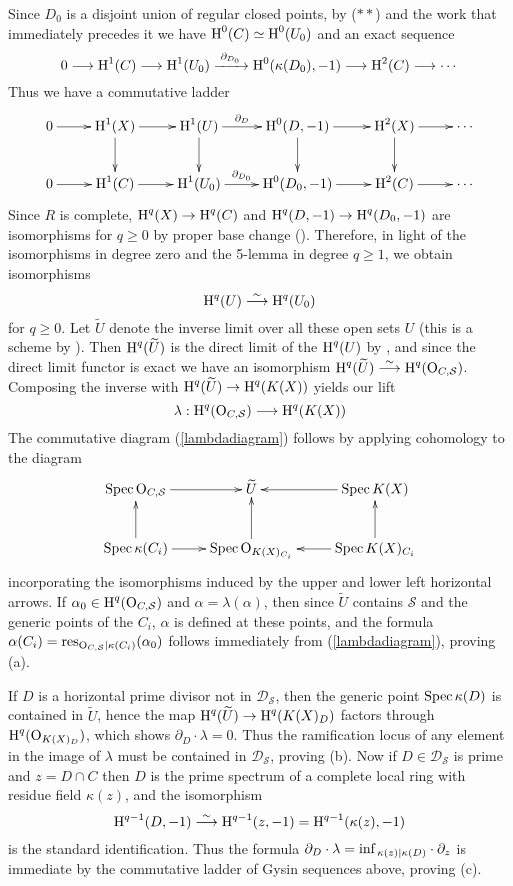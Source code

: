 \documentclass{amsart}
\theoremstyle{plain}
\theoremstyle{definition}
\theoremstyle{remark}
\numberwithin{equation}{section}%
\renewcommand{\H}{{\text{\rm H}}}
\renewcommand{\O}{{\text{\rm O}}}
\renewcommand{\S}{{\mathcal S}}
\renewcommand{\inf}{{\text{\rm inf}\,}}
\newcommand{\isim}{{\;\overset{\sim}{\longrightarrow}\;}}
\newcommand{\isom}{{\;\simeq\;}}
\newcommand{\res}{{\text{\rm res}}}
\newcommand{\Spec}{{\text{\rm Spec}\,}}
\begin{document}
Since $D_0$ is a disjoint union of regular closed points,
by ($**$) and the work that immediately precedes it we have
$\H^0(C)\isom\H^0(U_0)$ and an exact sequence
$$
0\longrightarrow\H^1(C)\longrightarrow\H^1(U_0)\xrightarrow{\;\partial_{D_0}\;}\H^0(\kappa(D_0),-1)
\longrightarrow \H^2(C)\longrightarrow\cdots
$$
Thus we have a commutative ladder
\[\xymatrix{
0\ar[r]&\H^1(X)\ar[r]\ar[d]&\H^1(U)\ar[r]^-{\partial_D}\ar[d]
&\H^0(D,-1)\ar[r]\ar[d]&\H^2(X)\ar[r]\ar[d]&\cdots\\
0\ar[r]&\H^1(C)\ar[r]&\H^1(U_0)\ar[r]^-{\partial_{D_0}}&\H^0(D_0,-1)
\ar[r]&\H^2(C)\ar[r]&\cdots
}\]
Since $R$ is complete,
$\H^q(X)\to\H^q(C)$ and $\H^q(D,-1)\to\H^q(D_0,-1)$ are
isomorphisms for $q\geq 0$ by proper base change (\cite[VI.Corollary 2.7]{M}).
Therefore, in light of the isomorphisms in degree zero and the 5-lemma in degree $q\geq 1$, 
we obtain isomorphisms
$$\H^q(U)\isim\H^q(U_0)$$
for $q\geq 0$.
Let $\widetilde U$ denote the inverse limit over all these open sets $U$ (this is a scheme by \cite[8.2.3]{EGAIV:c}).
Then $\H^q(\widetilde U)$ is the direct limit of the $\H^q(U)$ by \cite[III.1.16]{M}, and since
the direct limit functor is exact we have an isomorphism
$\H^q(\widetilde U)\isim\H^q(\O_{C,\S})$.
Composing the inverse with $\H^q(\widetilde U)\to\H^q(K(X))$ yields our lift
$$\lambda:\H^q(\O_{C,\S})\longrightarrow\H^q(K(X))$$
The commutative diagram (\ref{lambdadiagram}) follows by applying cohomology to the diagram
\[\xymatrix{
\Spec\O_{C,\S}\ar[r]&\widetilde U&\Spec K(X)\ar[l]\\
\Spec \kappa(C_i)\ar[r]\ar[u]&\Spec\O_{K(X)_{C_i}}\ar[u]&\Spec K(X)_{C_i}\ar[u]\ar[l]
}\]
incorporating the isomorphisms induced by the upper and lower left horizontal arrows.
If $\alpha_0\in\H^q(\O_{C,\S})$ and $\alpha=\lambda(\alpha)$,
then since $\widetilde U$ contains $\S$ and the generic points
of the $C_i$, $\alpha$ is defined at these points,
and the formula $\alpha(C_i)=\res_{\O_{C,\S}|\kappa(C_i)}(\alpha_0)$
follows immediately from (\ref{lambdadiagram}), proving (a).
 
If $D$ is a horizontal prime divisor not in $\mathscr D_\S$, then the generic point
$\Spec\kappa(D)$ is contained in $\widetilde U$, hence the map $\H^q(\widetilde U)\to\H^q(K(X)_D)$
factors through $\H^q(\O_{K(X)_D})$, which shows $\partial_D\cdot\lambda=0$.
Thus the ramification locus of any element in the image of $\lambda$ must be contained
in $\mathscr D_\S$, proving (b).
Now if $D\in\mathscr D_\S$ is prime and $z=D\cap C$ then 
$D$ is the prime spectrum of a complete local ring with residue field $\kappa(z)$, and the isomorphism
$$\H^{q-1}(D,-1)\isim\H^{q-1}(z,-1)=\H^{q-1}(\kappa(z),-1)$$
is the standard identification.
Thus the formula $\partial_D\cdot\lambda=\inf_{\kappa(z)|\kappa(D)}\cdot\partial_{z}$ is immediate
by the commutative ladder of Gysin sequences above, proving (c).
\end{document}
